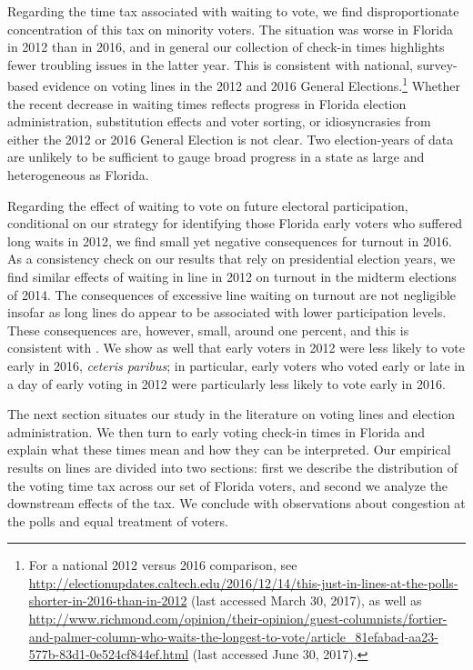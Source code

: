 \documentclass[12pt,titlepage]{article}
\begin{document}

Regarding the time tax associated with waiting to vote, we find
disproportionate concentration of this tax on minority voters.  The
situation was worse in Florida in 2012 than in 2016, and in general
our collection of check-in times highlights fewer troubling issues in
the latter year.  This is consistent with national, survey-based
evidence on voting lines in the 2012 and 2016 General
Elections.\footnote{For a national 2012 versus 2016 comparison, see
  \url{http://electionupdates.caltech.edu/2016/12/14/this-just-in-lines-at-the-polls-shorter-in-2016-than-in-2012}
  (last accessed March 30, 2017), as well as
  \url{http://www.richmond.com/opinion/their-opinion/guest-columnists/fortier-and-palmer-column-who-waits-the-longest-to-vote/article_81efabad-aa23-577b-83d1-0e524cf844ef.html}
  (last accessed June 30, 2017).}  Whether the recent decrease in
waiting times reflects progress in Florida election administration,
substitution effects and voter sorting, or idiosyncrasies from either
the 2012 or 2016 General Election is not clear.  Two election-years of
data are unlikely to be sufficient to gauge broad progress in a state
as large and heterogeneous as Florida.

Regarding the effect of waiting to vote on future electoral
participation, conditional on our strategy for identifying those
Florida early voters who suffered long waits in 2012, we find small
yet negative consequences for turnout in 2016.  As a consistency check
on our results that rely on presidential election years, we find
similar effects of waiting in line in 2012 on turnout in the midterm
elections of 2014.  The consequences of excessive line waiting on
turnout are not negligible insofar as long lines do appear to be
associated with lower participation levels.  These consequences are,
however, small, around one percent, and this is consistent with
\citet{pettigrew:longlinesminorityprecincts}.  We show as well that
early voters in 2012 were less likely to vote early in 2016,
\emph{ceteris paribus}; in particular, early voters who voted early or
late in a day of early voting in 2012 were particularly less likely to
vote early in 2016.

The next section situates our study in the literature on voting lines
and election administration.  We then turn to early voting check-in
times in Florida and explain what these times mean and how they can be
interpreted.  Our empirical results on lines are divided into two
sections: first we describe the distribution of the voting time tax
across our set of Florida voters, and second we analyze the downstream
effects of the tax.  We conclude with observations about congestion at
the polls and equal treatment of voters.
\end{document}
